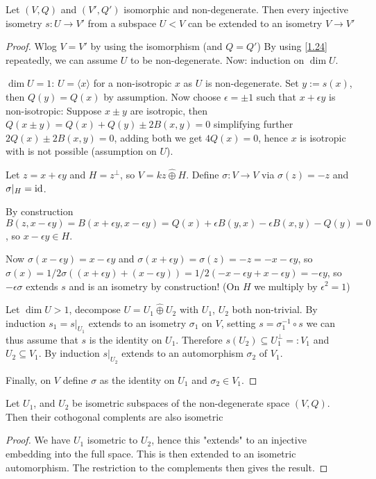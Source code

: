 \begin{theorem}[Witt]
  Let $(V, Q)$ and $(V', Q')$ isomorphic and 
  non-degenerate. Then every injective isometry 
  $s:U\to V'$ from a subspace $U<V$ can be extended to an isometry
  $V\to V'$
\end{theorem}
\begin{proof}
  Wlog $V = V'$ by using the isomorphism (and $Q = Q'$)
  By using \ref{1.24} repeatedly, we can assume $U$ to be non-degenerate.
  Now: induction on $\dim U$.

  $\dim U = 1$: $U = \langle x\rangle$ for a non-isotropic $x$ as $U$ is 
  non-degenerate. Set $y := s(x)$, then $Q(y) = Q(x)$ by assumption.
  Now choose $\epsilon=\pm1$ such that $x+\epsilon y$ is non-isotropic:
  Suppose $x\pm y$ are isotropic, then $Q(x\pm y) = Q(x) + Q(y) \pm 2B(x,y) = 0$  simplifying further $2Q(x) \pm 2B(x,y) = 0$, adding both we get
  $4Q(x) = 0$, hence $x$ is isotropic with is not possible (assumption on $U$).

  Let $z = x+\epsilon y$ and $H = z^\perp$, so $V = kz \hat\oplus H$.
  Define $\sigma:V \to V$ via $\sigma(z) = -z$ and $\sigma|_H = \mathop{\rm id}\nolimits$.

  By construction $B(z, x-\epsilon y) = B(x+\epsilon y, x-\epsilon y) = Q(x) 
  +\epsilon B(y, x) - \epsilon B(x, y) - Q(y) = 0$, so
  $x-\epsilon y\in H$.

  Now $\sigma(x-\epsilon y) = x-\epsilon y$ and $\sigma(x+\epsilon y) = \sigma(z) = -z = -x-\epsilon y$, so $\sigma(x) = 1/2\sigma((x+\epsilon y) + (x-\epsilon y)) = 1/2(-x-\epsilon y + x-\epsilon y) = -\epsilon y$,
  so $-\epsilon \sigma$ extends $s$ and is an isometry by construction! (On $H$
  we multiply by $\epsilon^2 = 1$)

  Let $\dim U>1$, decompose $U = U_1\hat\oplus U_2$ with $U_1$, $U_2$ both 
  non-trivial. By induction $s_1 = s|_{U_1}$ extends to an isometry $\sigma_1$
  on $V$,
  setting $s = \sigma_1^{-1}\circ s$ we can thus assume that $s$ is the identity
  on $U_1$.
  Therefore $s(U_2) \subseteq U_1^\perp =: V_1$ and $U_2\subseteq V_1$.
  By induction
  $s|_{U_2}$ extends to an automorphism $\sigma_2$ of $V_1$.

  Finally, on $V$ define $\sigma$ as the identity on $U_1$ and $\sigma_2\in V_1$.
\end{proof}

\begin{korollar}
  Let $U_1$, and $U_2$ be isometric subspaces of the non-degenerate space
  $(V, Q)$. Then their cothogonal complents are also isometric
\end{korollar}
\begin{proof}
  We have $U_1$ isometric to $U_2$, hence this "extends" to an 
  injective embedding into the full space. This is then extended to an
  isometric automorphism. The restriction to the complements then gives
  the result.
\end{proof}


